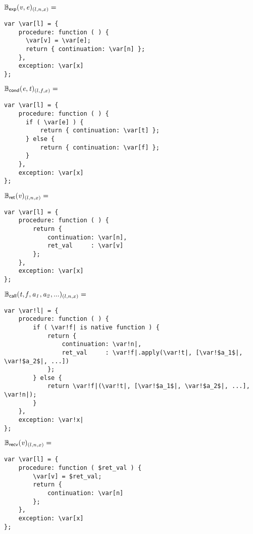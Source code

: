 \documentclass[a4j]{jsarticle}
\newcommand{\defB}[3]{{#1}({\sf #2})_{#3}}
\newcommand{\Bexp}{\defB{\mathbb{B}_{\sf exp}}}
\newcommand{\Bcond}{\defB{\mathbb{B}_{\sf cond}}}
\newcommand{\Bcall}{\defB{\mathbb{B}_{\sf call}}}
\newcommand{\Brecv}{\defB{\mathbb{B}_{\sf recv}}}
\newcommand{\Bret}{\defB{\mathbb{B}_{\sf ret}}}
\newcommand{\var}[1]{{\it #1}}
\begin{document}
$  \Bexp{ \var{v}, \var{e} }{(l, n, x)}  =  $
\begin{Verbatim}[frame=single, commandchars=\\\[\]]
var \var[l] = {
    procedure: function ( ) {
      \var[v] = \var[e];
      return { continuation: \var[n] };
    },
    exception: \var[x]
};
\end{Verbatim}


$  \Bcond{ \var{e}, \var{t} }{(l, f, x)}  =  $
\begin{Verbatim}[frame=single, commandchars=\\\[\]]
var \var[l] = {
    procedure: function ( ) {
      if ( \var[e] ) {
          return { continuation: \var[t] };
      } else {
          return { continuation: \var[f] };
      }
    },
    exception: \var[x]
};
\end{Verbatim}


$  \Bret{ \var{v} }{(l, n, x)}  =  $
\begin{Verbatim}[frame=single, commandchars=\\\[\]]
var \var[l] = {
    procedure: function ( ) {
        return {
            continuation: \var[n],
            ret_val     : \var[v]
        };
    },
    exception: \var[x]
};
\end{Verbatim}


$  \Bcall{ \var{t}, \var{f}, \var{a_1}, \var{a_2}, ... }{(l, n, x)}  =  $
\begin{Verbatim}[frame=single, commandchars=\\!|]
var \var!l| = {
    procedure: function ( ) {
        if ( \var!f| is native function ) {
            return {
                continuation: \var!n|,
                ret_val     : \var!f|.apply(\var!t|, [\var!$a_1$|, \var!$a_2$|, ...])
            };
        } else {
            return \var!f|(\var!t|, [\var!$a_1$|, \var!$a_2$|, ...], \var!n|);
        }
    },
    exception: \var!x|
};
\end{Verbatim}


$  \Brecv{ \var{v} }{(l, n, x)}  =  $
\begin{Verbatim}[frame=single, commandchars=\\\[\]]
var \var[l] = {
    procedure: function ( $ret_val ) {
        \var[v] = $ret_val;
        return {
            continuation: \var[n]
        };
    },
    exception: \var[x]
};
\end{Verbatim}
\end{document}

